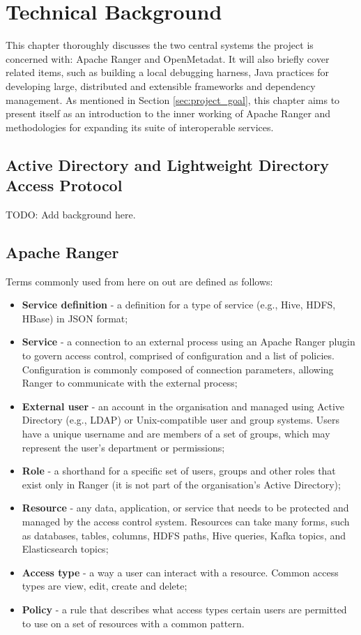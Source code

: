 \chapter{\label{cha:context} Technical Background}

This chapter thoroughly discusses the two central systems the project is concerned with: Apache Ranger and OpenMetadat. It will also briefly cover related items, such as building a local debugging harness, Java practices for developing large, distributed and extensible frameworks and dependency management. As mentioned in Section \ref{sec:project_goal}, this chapter aims to present itself as an introduction to the inner working of Apache Ranger and methodologies for expanding its suite of interoperable services.  

\section{Active Directory and Lightweight Directory Access Protocol}

TODO: Add background here.

\section{\label{sec:tech_background_apache_ranger} Apache Ranger}

Terms commonly used from here on out are defined as follows:

\begin{itemize}
    \item \textbf{Service definition} - a definition for a type of service (e.g., Hive, HDFS, HBase) in JSON format;
    \item \textbf{Service} - a connection to an external process using an Apache Ranger plugin to govern access control, comprised of configuration and a list of policies. Configuration is commonly composed of connection parameters, allowing Ranger to communicate with the external process;
    \item \textbf{External user} - an account in the organisation and managed using Active Directory (e.g., LDAP) or Unix-compatible user and group systems. Users have a unique username and are members of a set of groups, which may represent the user's department or permissions;
    \item \textbf{Role} - a shorthand for a specific set of users, groups and other roles that exist only in Ranger (it is not part of the organisation's Active Directory);
    \item \textbf{Resource} - any data, application, or service that needs to be protected and managed by the access control system. Resources can take many forms, such as databases, tables, columns, HDFS paths, Hive queries, Kafka topics, and Elasticsearch topics;
    \item \textbf{Access type} - a way a user can interact with a resource. Common access types are view, edit, create and delete; 
    \item \textbf{Policy} - a rule that describes what access types certain users are permitted to use on a set of resources with a common pattern.
\end{itemize}

